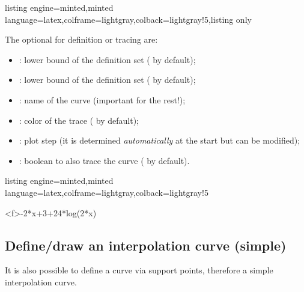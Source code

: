 \documentclass[11pt,a4paper]{ltxdoc}
\begin{document}
\begin{tcblisting}{listing engine=minted,minted language=latex,colframe=lightgray,colback=lightgray!5,listing only}
\end{tcblisting}

The optional \MontreCode{[keys]} for definition or tracing are:

\smallskip

\begin{itemize}
	\item {}: lower bound of the definition set ( by default);
	\item {}: lower bound of the definition set ( by default);
	\item {}: name of the curve (important for the rest!);
	\item {}: color of the trace ( by default);
	\item {}: plot step (it is determined \textit{automatically} at the start but can be modified);
	\item {}: boolean to also trace the curve ( by default).
\end{itemize}

\begin{tcblisting}{listing engine=minted,minted language=latex,colframe=lightgray,colback=lightgray!5}
\begin{GraphTikz}%
	[x=0.9cm,y=0.425cm,Xmin=4,Xmax=20,Origx=4,
	Ymin=40,Ymax=56,Ygrid=2,Ygrids=1,Origy=40]
	{-2*x+3+24*log(2*x)}
\end{GraphTikz}
\end{tcblisting}

\pagebreak

\subsection{Define/draw an interpolation curve (simple)}\label{deftracinterpo}

It is also possible to define a curve via support points, therefore a simple interpolation curve.
\end{document}
